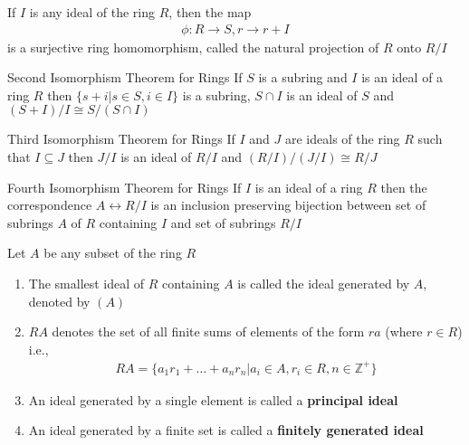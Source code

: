 \documentclass[titlepage, 12pt]{book}
\begin{document}
\begin{definition}{}{}
    If $I$ is any ideal of the ring $R$, then the map
    \begin{gather*}
        \phi:R\rightarrow S, r\rightarrow r+I
    \end{gather*}
    is a surjective ring homomorphism, called the natural projection of $R$ onto
    $R/I$
\end{definition}

\begin{theorem}{Second Isomorphism Theorem for Rings}{}
    If $S$ is a subring and $I$ is an ideal of a ring $R$ then $\{s + i|s\in S,
    i\in I\}$ is a subring, $S\cap I$ is an ideal of $S$ and $(S+I)/I\cong
    S/(S\cap I)$
\end{theorem}

\begin{theorem}{Third Isomorphism Theorem for Rings}{}
    If $I$ and $J$ are ideals of the ring $R$ such that $I\subseteq J$ then
    $J/I$ is an ideal of $R/I$ and $(R/I)/(J/I)\cong R/J$
\end{theorem}

\begin{theorem}{Fourth Isomorphism Theorem for Rings}{}
    If $I$ is an ideal of a ring $R$ then the correspondence $A\leftrightarrow
    R/I$ is an inclusion preserving bijection between set of subrings $A$ of $R$
    containing $I$ and set of subrings $R/I$
\end{theorem}

\begin{definition}{}{}
    Let $A$ be any subset of the ring $R$
    \begin{enumerate}
        \item The smallest ideal of $R$ containing $A$ is called the ideal
            generated by $A$, denoted by $(A)$
        \item $RA$ denotes the set of all finite sums of elements of the form
            $ra$ (where $r\in R$) i.e.,
            \begin{gather*}
                RA = \{a_1r_1+\dots+a_nr_n | a_i\in A, r_i\in R,
                n\in\mathbb{Z}^+\}
            \end{gather*}
        \item An ideal generated by a single element is called a
            \textbf{principal ideal}
        \item An ideal generated by a finite set is called a \textbf{finitely
            generated ideal}
    \end{enumerate}
\end{definition}
\end{document}
